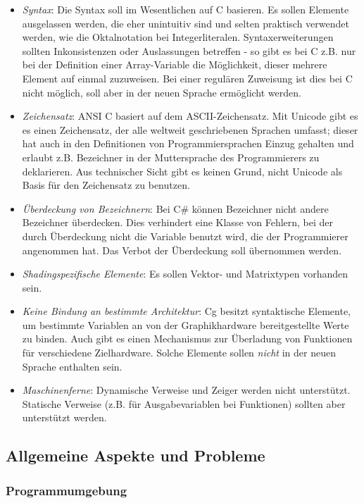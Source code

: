 \begin{itemize}
\item \emph{Syntax}: Die Syntax soll im Wesentlichen auf C basieren. Es sollen Elemente ausgelassen werden, die eher 
unintuitiv sind und selten praktisch verwendet werden, wie die Oktalnotation bei Integerliteralen.
Syntaxerweiterungen sollten Inkonsistenzen oder Auslassungen betreffen - so gibt es bei C z.B. 
nur bei der Definition einer Array-Variable die Möglichkeit, dieser mehrere Element auf einmal zuzuweisen.
Bei einer regulären Zuweisung ist dies bei C nicht möglich, soll aber in der neuen Sprache ermöglicht werden.
\item \emph{Zeichensatz}: ANSI C basiert auf dem ASCII-Zeichensatz. %
Mit Unicode gibt es es einen Zeichensatz, der alle weltweit geschriebenen Sprachen umfasst; dieser
hat auch in den Definitionen von Programmiersprachen Einzug gehalten %
und erlaubt z.B. Bezeichner in der Muttersprache des Programmierers zu deklarieren.
Aus technischer Sicht gibt es keinen Grund, nicht Unicode als Basis für den Zeichensatz zu benutzen.
\item \emph{Überdeckung von Bezeichnern}: Bei C\# können Bezeichner nicht andere Bezeichner überdecken. Dies
verhindert eine Klasse von Fehlern, bei der durch Überdeckung nicht die Variable benutzt wird, die der
Programmierer angenommen hat. Das Verbot der Überdeckung soll übernommen werden.
\item \emph{Shadingspezifische Elemente}: Es sollen Vektor- und Matrixtypen vorhanden sein.
\item \emph{Keine Bindung an bestimmte Architektur}: Cg besitzt syntaktische Elemente, um bestimmte Variablen an
von der Graphikhardware bereitgestellte Werte zu binden. Auch gibt es einen Mechanismus zur Überladung von Funktionen
für verschiedene Zielhardware. Solche Elemente sollen \emph{nicht} in der neuen Sprache enthalten sein.
\item \emph{Maschinenferne}: Dynamische Verweise und 
Zeiger werden nicht unterstützt. Statische Verweise (z.B. für Ausgabevariablen bei Funktionen) sollten aber unterstützt
werden.
\end{itemize}

\newpage

\subsection{Allgemeine Aspekte und Probleme}

\subsubsection{Programmumgebung}

